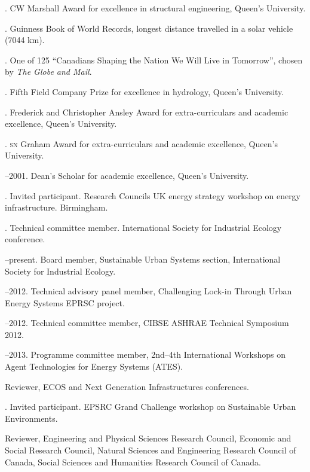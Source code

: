 \documentclass[11pt,a4paper]{article}
\begin{document}
. CW Marshall Award for excellence in structural engineering, Queen's University.

.  Guinness Book of World Records, longest distance travelled in a solar vehicle (7044 km).

. One of 125 ``Canadians Shaping the Nation We Will Live in Tomorrow'', chosen by \emph{The Globe and Mail}.

.  Fifth Field Company Prize for excellence in hydrology, Queen's University.

. Frederick and Christopher Ansley Award for extra-curriculars and academic excellence, Queen's University.

.  \textsc{sn} Graham Award for extra-curriculars and academic excellence, Queen's University.

--2001.  Dean's Scholar for academic excellence, Queen's University.

\bigskip 

\noindent{}%
.  Invited participant.  Research Councils UK energy strategy workshop on energy infrastructure.  Birmingham.

.  Technical committee member.  International Society for Industrial Ecology conference.

--present. Board member, Sustainable Urban Systems section, International Society for Industrial Ecology.

--2012. Technical advisory panel member, Challenging Lock-in Through Urban Energy Systems EPRSC project.

--2012. Technical committee member, CIBSE ASHRAE Technical Symposium 2012.

--2013. Programme committee member, 2nd--4th International Workshops on Agent Technologies for Energy Systems (ATES).

 Reviewer, ECOS and Next Generation Infrastructures conferences.

. Invited participant.  EPSRC Grand Challenge workshop on Sustainable Urban Environments.

\ind Reviewer, Engineering and Physical Sciences Research Council, Economic and Social Research Council, Natural Sciences and Engineering Research Council of Canada, Social Sciences and Humanities Research Council of Canada.
\end{document}
